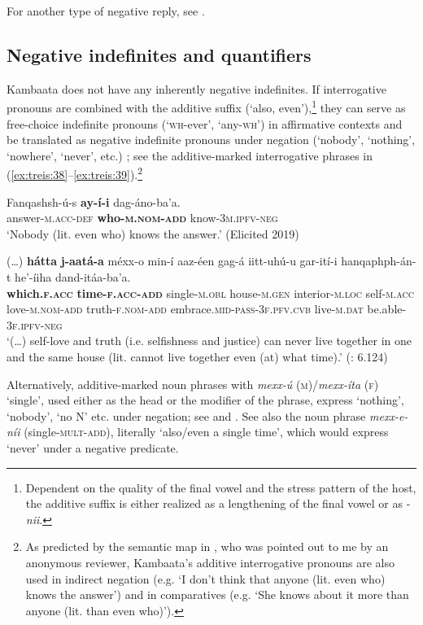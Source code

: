 \documentclass[output=paper,colorlinks,citecolor=brown,draftmode
]{langscibook}
\begin{document}
For another type of negative reply, see .

\subsection{Negative indefinites and quantifiers}\label{sec:treis:3.2}

Kambaata does not have any inherently negative indefinites. If interrogative pronouns are combined with the additive suffix (‘also, even’),\footnote{Dependent on the quality of the final vowel and the stress pattern of the host, the additive suffix is either realized as a lengthening of the final vowel or as -\textit{nii}.} they can serve as free-choice indefinite pronouns (‘\textsc{wh}-ever’, ‘any-\textsc{wh}’) 
in affirmative contexts and be translated as negative indefinite pronouns under negation (‘nobody’, ‘nothing’, ‘nowhere’, ‘never’, etc.) \citep{Treis2015}; see the additive-marked interrogative phrases in (\ref{ex:treis:38}--\ref{ex:treis:39}).\footnote{As predicted by the semantic map in \citet[64]{Haspelmath1997}, who was pointed out to me by an anonymous reviewer, Kambaata's additive interrogative pronouns are also used in indirect negation (e.g. ‘I don't think that anyone (lit. even who) knows the answer’) and in comparatives (e.g. ‘She knows about it more than anyone (lit. than even who)’).} 

\ea\label{ex:treis:38}
\gll Fanqashsh-ú-s \textbf{ay-í-i} dag-áno-ba’a.\\   
answer-\textsc{m.acc-def}	\textbf{who-\textsc{m.nom-add}}	know-\textsc{3m.ipfv-neg}\\
\glt ‘Nobody (lit. even who) knows the answer.’  (Elicited 2019)
\z

\ea\label{ex:treis:39} 
\gll (…) 	\textbf{hátta}				\textbf{j-aatá-a}				méxx-o			min-í	aaz-éen 				gag-á			iitt-uhú-u				gar-ití-i	hanqaphph-án-t					he’-íiha		dand-itáa-ba’a. \\
{} \textbf{which.\textsc{f.acc}}	\textbf{time-\textsc{f.acc-add}}	single-\textsc{m.obl}	house-\textsc{m.gen} interior-\textsc{m.loc} 	self-\textsc{m.acc}	love-\textsc{m.nom-add}	truth-\textsc{f.nom-add} embrace.\textsc{mid-pass-3f.pfv.cvb} 	live-\textsc{m.dat}	be.able-\textsc{3f.ipfv-neg}\\
\glt ‘(…) self-love and truth (i.e. selfishness and justice) can never live together in one and the same house (lit. cannot live together even (at) what time).’ (\cite{KEB1989}{:} 6.124)
\z 

Alternatively, additive-marked noun phrases with \textit{mexx-ú} (\textsc{m})/\textit{mexx-íta} (\textsc{f}) ‘single’, used either as the head or the modifier of the phrase, express ‘nothing’, ‘nobody’, ‘no N’ etc. under negation; see  and . See also the noun phrase \textit{mexx-e-níi} (single-\textsc{mult-add}), literally ‘also/even a single time’, which would express ‘never’ under a negative predicate.
\end{document}

